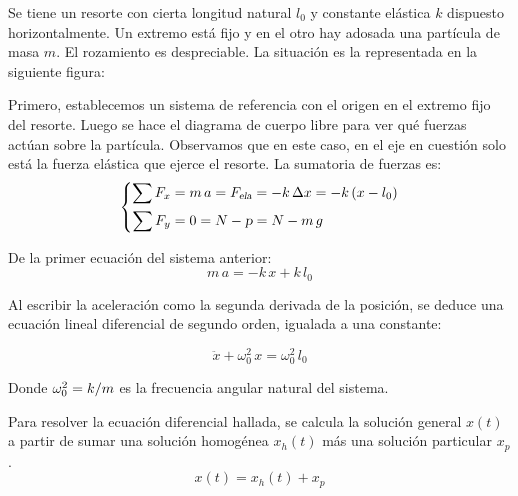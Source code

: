 Se tiene un resorte con cierta longitud natural $l_0$ y constante elástica $k$ dispuesto horizontalmente.
Un extremo está fijo y en el otro hay adosada una partícula de masa $m$.
El rozamiento es despreciable.
La situación es la representada en la siguiente figura:

\begin{center}
    \def\svgwidth{0.7\linewidth}
    
\end{center}

Primero, establecemos un sistema de referencia con el origen en el extremo fijo del resorte.
Luego se hace el diagrama de cuerpo libre para ver qué fuerzas actúan sobre la partícula.
Observamos que en este caso, en el eje en cuestión solo está la fuerza elástica que ejerce el resorte.
La sumatoria de fuerzas es:
\begin{equation*}
    \left\{
    \begin{aligned}
        \sum F_x &= m \, a = {{F}_\textsl{{ela}}} = - k \, \Delta x = - k \left(x-l_0\right)
        \\
        \sum F_y &= 0 = N - \textsl{p} = N - m \, g
    \end{aligned}
    \right.
\end{equation*}

De la primer ecuación del sistema anterior:
\begin{equation*}
    m \, a = -k \, x + k \, l_0
\end{equation*}

Al escribir la aceleración como la segunda derivada de la posición, se deduce una ecuación lineal diferencial de segundo orden, igualada a una constante:

\begin{mdframed}[style=DefinitionFrame]
    \begin{defn}
    \end{defn}
    \begin{equation*}
        \ddot{x} + \omega_0^2 \, x = \omega_0^2 \, l_0
    \end{equation*}
\end{mdframed}

Donde $\omega_0^2 = k/m$ es la frecuencia angular natural del sistema.

Para resolver la ecuación diferencial hallada, se calcula la solución general $x(t)$ a partir de sumar una solución homogénea $x_h(t)$ más una solución particular $x_p$.
\[ x(t) = x_h(t) + x_p \]

